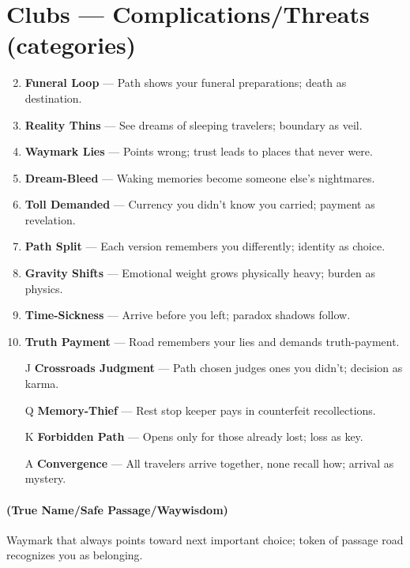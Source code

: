 \section*{Clubs --- Complications/Threats (categories)}
\label{sec:ways-between-complications}
\begin{enumerate}
\setcounter{enumi}{1}
\item \textbf{Funeral Loop} --- Path shows your funeral preparations; death as destination.
\item \textbf{Reality Thins} --- See dreams of sleeping travelers; boundary as veil.
\item \textbf{Waymark Lies} --- Points wrong; trust leads to places that never were.
\item \textbf{Dream-Bleed} --- Waking memories become someone else's nightmares.
\item \textbf{Toll Demanded} --- Currency you didn't know you carried; payment as revelation.
\item \textbf{Path Split} --- Each version remembers you differently; identity as choice.
\item \textbf{Gravity Shifts} --- Emotional weight grows physically heavy; burden as physics.
\item \textbf{Time-Sickness} --- Arrive before you left; paradox shadows follow.
\item \textbf{Truth Payment} --- Road remembers your lies and demands truth-payment.
\item[J] \textbf{Crossroads Judgment} --- Path chosen judges ones you didn't; decision as karma.
\item[Q] \textbf{Memory-Thief} --- Rest stop keeper pays in counterfeit recollections.
\item[K] \textbf{Forbidden Path} --- Opens only for those already lost; loss as key.
\item[A] \textbf{Convergence} --- All travelers arrive together, none recall how; arrival as mystery.
\end{enumerate}

\paragraph*{(True Name/Safe Passage/Waywisdom)} Waymark that always points toward next important choice; token of passage road recognizes you as belonging.

